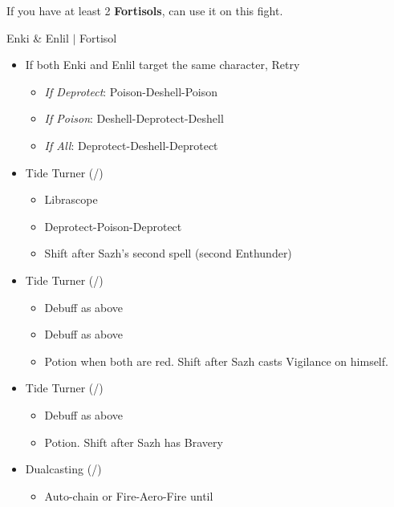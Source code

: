 \renewcommand{\first}{[1] Slash \& Burn (\rav/\com)}
\renewcommand{\second}{[2] Tide Turner (\sab/\syn)}
\renewcommand{\third}{[3] Tide Turner (\sab/\syn)}
\renewcommand{\fourth}{[4] Dualcasting (\rav/\rav)}
\renewcommand{\fifth}{[5] Undermine (\sab/\rav)}
\renewcommand{\sixth}{[6] Divide \& Conquer (\sab/\com)}
\newpage
If you have at least 2 \textbf{Fortisols}, can use it on this fight.
\begin{battle}{Enki \& Enlil $|$ Fortisol}
\begin{multicols}{2}
\begin{itemize}
    \item If both Enki and Enlil target the same character, Retry
    
        \begin{itemize}
            \item \textit{If Deprotect}: Poison-Deshell-Poison
            \item \textit{If Poison}: Deshell-Deprotect-Deshell
            \item \textit{If All}: Deprotect-Deshell-Deprotect
        \end{itemize}
    \item \second
    \begin{itemize}
        \item Librascope
        \item Deprotect-Poison-Deprotect
        \item Shift after Sazh's second spell (second Enthunder)
    \end{itemize}
    \item \third
    \begin{itemize}
        \item Debuff as above
        \item Debuff as above
        \item Potion when both are red. Shift after Sazh casts Vigilance on himself.
    \end{itemize}
    \item \second
    \begin{itemize}
        \item Debuff as above
        \item Potion. Shift after Sazh has Bravery
    \end{itemize}
    \item \fourth
    \begin{itemize}
        \item Auto-chain or Fire-Aero-Fire until \stagger
    \end{itemize}

\end{itemize}
\end{multicols}
\end{battle}
